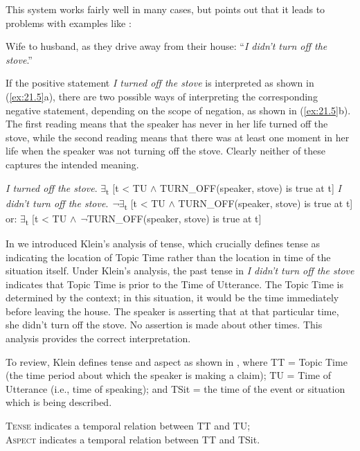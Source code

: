 This system works fairly well in many cases, but \citet{Partee1973} points out that it leads to problems with examples like :


\ea \label{ex:21.4}
Wife to husband, as they drive away from their house: “\textit{I didn’t turn off the stove}.”
\z


If the positive statement \textit{I turned off the stove} is interpreted as shown in (\ref{ex:21.5}a), there are two possible ways of interpreting the corresponding negative statement, depending on the scope of negation, as shown in (\ref{ex:21.5}b). The first reading means that the speaker has never in her life turned off the stove, while the second reading means that there was at least one moment in her life when the speaker was not turning off the stove. Clearly neither of these captures the intended meaning.


\ea \label{ex:21.5}
\ea   \textit{I turned off the stove}.  ${\exists}$\textsubscript{t} [t < TU $\wedge$ TURN\_OFF(speaker, stove) is true at t]
\ex   \textit{I didn’t turn off the stove}.  \textit{¬}${\exists}$\textsubscript{t} [t < TU $\wedge$ TURN\_OFF(speaker, stove) is true at t]\\
  or:  ${\exists}$\textsubscript{t} [t < TU $\wedge$ \textit{¬}TURN\_OFF(speaker, stove) is true at t]
\z \z

In  we introduced Klein’s analysis of tense, which crucially defines tense as indicating the location of Topic Time rather than the location in time of the situation itself. Under Klein’s analysis, the past tense in  \textit{I didn’t turn off the stove} indicates that Topic Time is prior to the Time of Utterance. The Topic Time is determined by the context; in this situation, it would be the time immediately before leaving the house. The speaker is asserting that at that particular time, she didn’t turn off the stove. No assertion is made about other times. This analysis provides the correct interpretation.


To review, Klein defines tense and aspect as shown in , where TT = Topic Time (the time period about which the speaker is making a claim); TU = Time of Utterance (i.e., time of speaking); and TSit = the time of the event or situation which is being described.


\ea \label{ex:21.6}
\ea  \textsc{Tense} indicates a temporal relation between TT and TU;\\
\ex \textsc{Aspect} indicates a temporal relation between TT and TSit.
                       \z
\z


